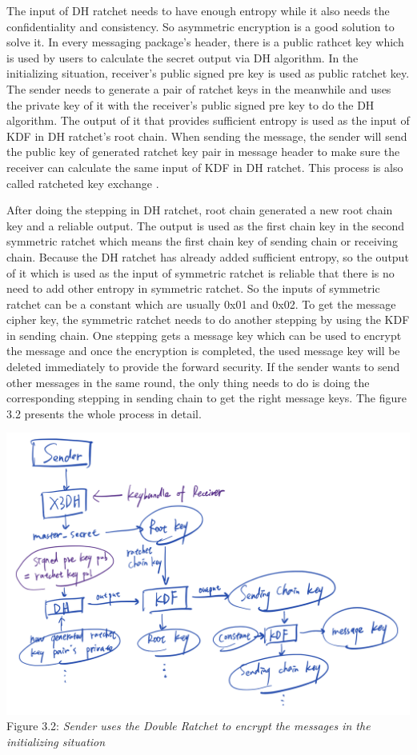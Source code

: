 \begin{enumerate}[label=(\roman*)]
The input of DH ratchet needs to have enough entropy while it also needs the confidentiality and consistency. So asymmetric encryption is a good solution to solve it. In every messaging package's header, there is a public rathcet key which is used by users to calculate the secret output via DH algorithm. In the initializing situation, receiver's public signed pre key is used as public ratchet key. The sender needs to generate a pair of ratchet keys in the meanwhile and uses the private key of it with the receiver's public signed pre key to do the DH algorithm. The output of it that provides sufficient entropy is used as the input of KDF in DH ratchet's root chain. When sending the message, the sender will send the public key of generated ratchet key pair in message header to make sure the receiver can calculate the same input of KDF in DH ratchet. This process is also called ratcheted key exchange \citep{RatchetedKeyExchange}.

After doing the stepping in DH ratchet, root chain generated a new root chain key and a reliable output. The output is used as the first chain key in the second symmetric ratchet which means the first chain key of sending chain or receiving chain. Because the DH ratchet has already added sufficient entropy, so the output of it which is used as the input of symmetric ratchet is reliable that there is no need to add other entropy in symmetric ratchet. So the inputs of symmetric ratchet can be a constant which are usually 0x01 and 0x02. To get the message cipher key, the symmetric ratchet needs to do another stepping by using the KDF in sending chain. One stepping gets a message key which can be used to encrypt the message and once the encryption is completed, the used message key will be deleted immediately to provide the forward security. If the sender wants to send other messages in the same round, the only thing needs to do is doing the corresponding stepping in sending chain to get the right message keys. The figure 3.2 presents the whole process in detail.

\begin{center}
\includegraphics[scale=.5]{../3-Background/resources/DH-init.png}\\
Figure 3.2: \textit{Sender uses the Double Ratchet to encrypt the messages in the initializing situation}
\end{center}


\end{enumerate}
